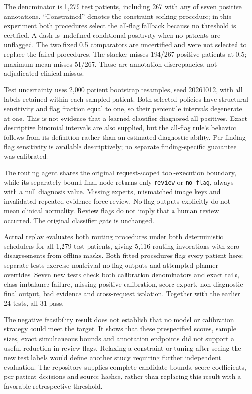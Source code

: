 \documentclass[10pt,a4paper]{article}
\begin{document}
\begin{center}\small\setlength{\tabcolsep}{3pt}

\end{center}
\noindent The denominator is 1,279 test patients, including 267 with any of seven positive annotations. ``Constrained'' denotes the constraint-seeking procedure; in this experiment both procedures select the all-flag fallback because no threshold is certified. A dash is undefined conditional positivity when no patients are unflagged. The two fixed 0.5 comparators are uncertified and were not selected to replace the failed procedures. The stacker misses 194/267 positive patients at 0.5; maximum mean misses 51/267. These are annotation discrepancies, not adjudicated clinical misses.

Test uncertainty uses 2,000 patient bootstrap resamples, seed 20261012, with all labels retained within each sampled patient. Both selected policies have structural sensitivity and flag fraction equal to one, so their percentile intervals degenerate at one. This is not evidence that a learned classifier diagnosed all positives. Exact descriptive binomial intervals are also supplied, but the all-flag rule's behavior follows from its definition rather than an estimated diagnostic ability. Per-finding flag sensitivity is available descriptively; no separate finding-specific guarantee was calibrated.

The routing agent shares the original request-scoped tool-execution boundary, while its separately bound final node returns only \texttt{review} or \texttt{no\_flag}, always with a null diagnosis value. Missing experts, mismatched image keys and invalidated repeated evidence force review. No-flag outputs explicitly do not mean clinical normality. Review flags do not imply that a human review occurred. The original classifier gate is unchanged.

Actual replay evaluates both routing procedures under both deterministic schedulers for all 1,279 test patients, giving 5,116 routing invocations with zero disagreements from offline masks. Both fitted procedures flag every patient here; separate tests exercise nontrivial no-flag outputs and attempted planner overrides. Seven new tests check both calibration denominators and exact tails, class-imbalance failure, missing positive calibration, score export, non-diagnostic final output, bad evidence and cross-request isolation. Together with the earlier 24 tests, all 31 pass.

The negative feasibility result does not establish that no model or calibration strategy could meet the target. It shows that these prespecified scores, sample sizes, exact simultaneous bounds and annotation endpoints did not support a useful reduction in review flags. Relaxing a constraint or tuning after seeing the new test labels would define another study requiring further independent evaluation. The repository supplies complete candidate bounds, score coefficients, per-patient decisions and source hashes, rather than replacing this result with a favorable retrospective threshold.
\end{document}
